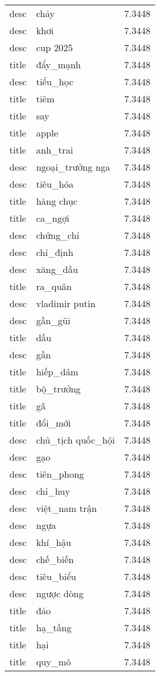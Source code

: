 \documentclass{article}
\begin{document}
\begin{tabular}{lll}
desc & chảy & 7.3448\\
desc & khơi & 7.3448\\
desc & cup 2025 & 7.3448\\
title & đẩy\_mạnh & 7.3448\\
desc & tiểu\_học & 7.3448\\
title & tiêm & 7.3448\\
title & say & 7.3448\\
title & apple & 7.3448\\
title & anh\_trai & 7.3448\\
desc & ngoại\_trưởng nga & 7.3448\\
desc & tiêu\_hóa & 7.3448\\
title & hàng chục & 7.3448\\
title & ca\_ngợi & 7.3448\\
desc & chứng\_chỉ & 7.3448\\
desc & chỉ\_định & 7.3448\\
desc & xăng\_dầu & 7.3448\\
title & ra\_quân & 7.3448\\
desc & vladimir putin & 7.3448\\
desc & gần\_gũi & 7.3448\\
title & dấu & 7.3448\\
desc & gần & 7.3448\\
title & hiếp\_dâm & 7.3448\\
title & bộ\_trưởng & 7.3448\\
title & gã & 7.3448\\
title & đổi\_mới & 7.3448\\
desc & chủ\_tịch quốc\_hội & 7.3448\\
desc & gạo & 7.3448\\
desc & tiên\_phong & 7.3448\\
desc & chỉ\_huy & 7.3448\\
desc & việt\_nam trận & 7.3448\\
desc & ngựa & 7.3448\\
desc & khí\_hậu & 7.3448\\
desc & chế\_biến & 7.3448\\
desc & tiêu\_biểu & 7.3448\\
desc & ngược dòng & 7.3448\\
title & đảo & 7.3448\\
title & hạ\_tầng & 7.3448\\
title & hại & 7.3448\\
title & quy\_mô & 7.3448\\

\end{tabular}
\end{document}
